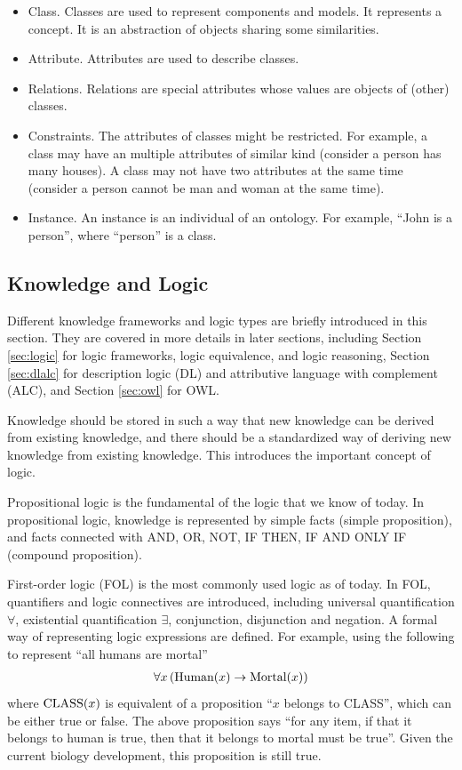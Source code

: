 \begin{itemize}
  \item Class. Classes are used to represent components and models. It represents a concept. It is an abstraction of objects sharing some similarities.
  \item Attribute. Attributes are used to describe classes.
  \item Relations. Relations are special attributes whose values are objects of (other) classes.
  \item Constraints. The attributes of classes might be restricted. For example, a class may have an multiple attributes of similar kind (consider a person has many houses). A class may not have two attributes at the same time (consider a person cannot be man and woman at the same time).
  \item Instance. An instance is an individual of an ontology. For example, “John is a person”, where “person” is a class.
\end{itemize}

\subsection{Knowledge and Logic} \label{subsec:knowledgeandlogic}

Different knowledge frameworks and logic types are briefly introduced in this section. They are covered in more details in later sections, including Section \ref{sec:logic} for logic frameworks, logic equivalence, and logic reasoning, Section \ref{sec:dlalc} for description logic (DL) and attributive language with complement (ALC), and Section \ref{sec:owl} for OWL.

Knowledge should be stored in such a way that new knowledge can be derived from existing knowledge, and there should be a standardized way of deriving new knowledge from existing knowledge. This introduces the important concept of logic.

Propositional logic is the fundamental of the logic that we know of today. In propositional logic, knowledge is represented by simple facts (simple proposition), and facts connected with  AND, OR, NOT, IF THEN, IF AND ONLY IF (compound proposition).

First-order logic (FOL) is the most commonly used logic as of today. In FOL, quantifiers and logic connectives are introduced, including universal quantification $\forall$, existential quantification $\exists$, conjunction, disjunction and negation. A formal way of representing logic expressions are defined. For example, using the following to represent ``all humans are mortal''
\begin{eqnarray}
\forall x \left(\textup{Human}(x) \rightarrow \textup{Mortal}(x)\right) \nonumber
\end{eqnarray}
where $\textup{CLASS}(x)$ is equivalent of a proposition ``$x$ belongs to CLASS'', which can be either true or false. The above proposition says ``for any item, if that it belongs to human is true, then that it belongs to mortal must be true''. Given the current biology development, this proposition is still true.

